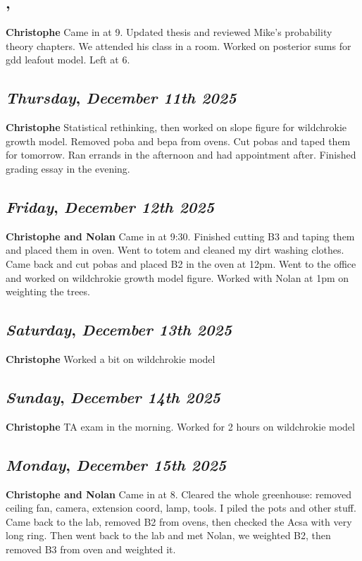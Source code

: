 \subsection*{\weekday, \day}
\textbf {Christophe}
Came in at 9. Updated thesis and reviewed Mike's probability theory chapters. We attended his class in a room. Worked on posterior sums for gdd leafout model. Left at 6.

\def\day{\textit{December 11th 2025}}
\def\weekday{\textit{Thursday}}
\subsection*{\weekday, \day}
\textbf {Christophe}
Statistical rethinking, then worked on slope figure for wildchrokie growth model. Removed poba and bepa from ovens. Cut pobas and taped them for tomorrow. Ran errands in the afternoon and had appointment after. Finished grading essay in the evening. 

\def\day{\textit{December 12th 2025}}
\def\weekday{\textit{Friday}}
\subsection*{\weekday, \day}
\textbf {Christophe and Nolan}
Came in at 9:30. Finished cutting B3 and taping them and placed them in oven. Went to totem and cleaned my dirt washing clothes. Came back and cut pobas and placed B2 in the oven at 12pm. Went to the office and worked on wildchrokie growth model figure. Worked with Nolan at 1pm on weighting the trees.

\def\day{\textit{December 13th 2025}}
\def\weekday{\textit{Saturday}}
\subsection*{\weekday, \day}
\textbf {Christophe}
Worked a bit on wildchrokie model

\def\day{\textit{December 14th 2025}}
\def\weekday{\textit{Sunday}}
\subsection*{\weekday, \day}
\textbf {Christophe}
TA exam in the morning. Worked for 2 hours on wildchrokie model

\def\day{\textit{December 15th 2025}}
\def\weekday{\textit{Monday}}
\subsection*{\weekday, \day}
\textbf{Christophe and Nolan}
Came in at 8. Cleared the whole greenhouse: removed ceiling fan, camera, extension coord, lamp, tools. I piled the pots and other stuff. Came back to the lab, removed B2 from ovens, then checked the Acsa with very long ring. Then went back to the lab and met Nolan, we weighted B2, then removed B3 from oven and weighted it. 
